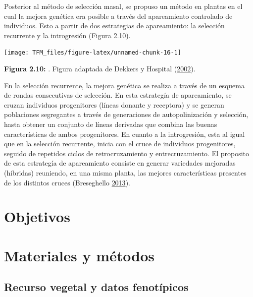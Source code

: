 \documentclass[11pt,spanish,a4paper,oneside,]{book} %
\begin{document}
Posterior al método de selección masal, se propuso un método en plantas en el cual la mejora genética era posible a través del apareamiento controlado de individuos. Esto a partir de dos estrategias de apareamiento: la selección recurrente y la introgresión (Figura 2.10).

\begin{center}\texttt{[image: TFM\_files/figure-latex/unnamed-chunk-16-1]} \end{center}

\begin{center}
\textbf{Figura 2.10:} . Figura adaptada de Dekkers y Hospital (\protect\hyperlink{ref-cite:59}{2002}).

\end{center}

En la selección recurrente, la mejora genética se realiza a través de un esquema de rondas consecutivas de selección. En esta estrategía de apareamiento, se cruzan individuos progenitores (líneas donante y receptora) y se generan poblaciones segregantes a través de generaciones de autopolinización y selección, hasta obtener un conjunto de líneas derivadas que combina las buenas características de ambos progenitores. En cuanto a la introgresión, esta al igual que en la selección recurrente, inicia con el cruce de individuos progenitores, seguido de repetidos ciclos de retrocruzamiento y entrecruzamiento. El proposito de esta estrategía de apareamiento consiste en generar variedades mejoradas (híbridas) reuniendo, en una misma planta, las mejores características presentes de los distintos cruces (Breseghello \protect\hyperlink{ref-cite:57}{2013}).

\hypertarget{objetivos}{%
\chapter{Objetivos}\label{objetivos}}

\hypertarget{materiales-y-muxe9todos}{%
\chapter{Materiales y métodos}\label{materiales-y-muxe9todos}}

\hypertarget{recurso-vegetal-y-datos-fenotuxedpicos}{%
\section{Recurso vegetal y datos fenotípicos}\label{recurso-vegetal-y-datos-fenotuxedpicos}}
\end{document}
